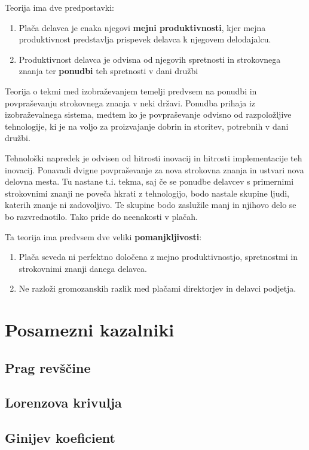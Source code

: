 \documentclass[a4paper,12 pt]{article}
\begin{document}
Teorija ima dve predpostavki:
\begin{enumerate}
\item Plača delavca je enaka njegovi \textbf{mejni produktivnosti}, kjer mejna produktivnost predstavlja prispevek delavca k njegovem delodajalcu.
\item Produktivnost delavca je odvisna od njegovih spretnosti in strokovnega znanja ter \textbf{ponudbi} teh spretnosti v dani družbi
\end{enumerate}

Teorija o tekmi med izobraževanjem temelji predvsem na ponudbi in povpraševanju strokovnega znanja v neki državi. Ponudba prihaja iz izobraževalnega sistema, medtem ko je povpraševanje odvisno od razpoložljive tehnologije, ki je na voljo za proizvajanje dobrin in storitev, potrebnih v dani družbi.

Tehnološki napredek je odvisen od hitrosti inovacij in hitrosti implementacije teh inovacij. Ponavadi dvigne povpraševanje za nova strokovna znanja in ustvari nova delovna mesta. Tu nastane t.i. tekma, saj če se ponudbe delavcev s primernimi strokovnimi znanji ne poveča hkrati z tehnologijo, bodo nastale skupine ljudi, katerih znanje ni zadovoljivo. Te skupine bodo zaslužile manj in njihovo delo se bo razvrednotilo. Tako pride do neenakosti v plačah.

Ta teorija ima predvsem dve veliki \textbf{pomanjkljivosti}:
\begin{enumerate}
\item Plača seveda ni perfektno določena z mejno produktivnostjo, spretnostmi in strokovnimi znanji danega delavca.
\item Ne razloži gromozanskih razlik med plačami direktorjev in delavci podjetja.
\end{enumerate}


\newpage

\section[Posamezni kazalniki]{Posamezni kazalniki}
\subsection[Prag revščine]{Prag revščine}
\subsection[Lorenzova krivulja]{Lorenzova krivulja}
\subsection[Ginijev koeficient]{Ginijev koeficient}
\end{document}
